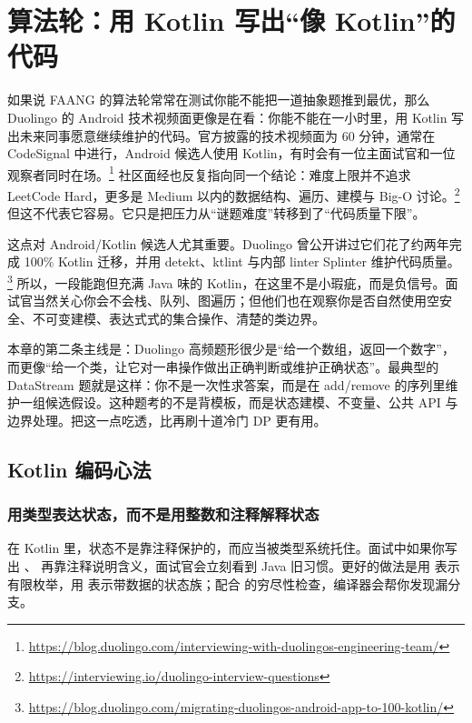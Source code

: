 \chapter{算法轮：用 Kotlin 写出“像 Kotlin”的代码}

如果说 FAANG 的算法轮常常在测试你能不能把一道抽象题推到最优，那么 Duolingo 的 Android 技术视频面更像是在看：你能不能在一小时里，用 Kotlin 写出未来同事愿意继续维护的代码。官方披露的技术视频面为 60 分钟，通常在 CodeSignal 中进行，Android 候选人使用 Kotlin，有时会有一位主面试官和一位观察者同时在场。\srcofficial\footnote{\url{https://blog.duolingo.com/interviewing-with-duolingos-engineering-team/}} 社区面经也反复指向同一个结论：难度上限并不追求 LeetCode Hard，更多是 Medium 以内的数据结构、遍历、建模与 Big-O 讨论。\srccommunity\footnote{\url{https://interviewing.io/duolingo-interview-questions}} 但这不代表它容易。它只是把压力从“谜题难度”转移到了“代码质量下限”。

这点对 Android/Kotlin 候选人尤其重要。Duolingo 曾公开讲过它们花了约两年完成 100\% Kotlin 迁移，并用 detekt、ktlint 与内部 linter Splinter 维护代码质量。\srcofficial\footnote{\url{https://blog.duolingo.com/migrating-duolingos-android-app-to-100-kotlin/}} 所以，一段能跑但充满 Java 味的 Kotlin，在这里不是小瑕疵，而是负信号。面试官当然关心你会不会栈、队列、图遍历；但他们也在观察你是否自然使用空安全、不可变建模、表达式式的集合操作、清楚的类边界。

本章的第二条主线是：Duolingo 高频题形很少是“给一个数组，返回一个数字”，而更像“给一个类，让它对一串操作做出正确判断或维护正确状态”。最典型的 DataStream 题就是这样：你不是一次性求答案，而是在 add/remove 的序列里维护一组候选假设。这种题考的不是背模板，而是状态建模、不变量、公共 API 与边界处理。把这一点吃透，比再刷十道冷门 DP 更有用。

\section{Kotlin 编码心法}

\subsection*{用类型表达状态，而不是用整数和注释解释状态}

在 Kotlin 里，状态不是靠注释保护的，而应当被类型系统托住。面试中如果你写出 、 再靠注释说明含义，面试官会立刻看到 Java 旧习惯。更好的做法是用  表示有限枚举，用  表示带数据的状态族；配合  的穷尽性检查，编译器会帮你发现漏分支。

